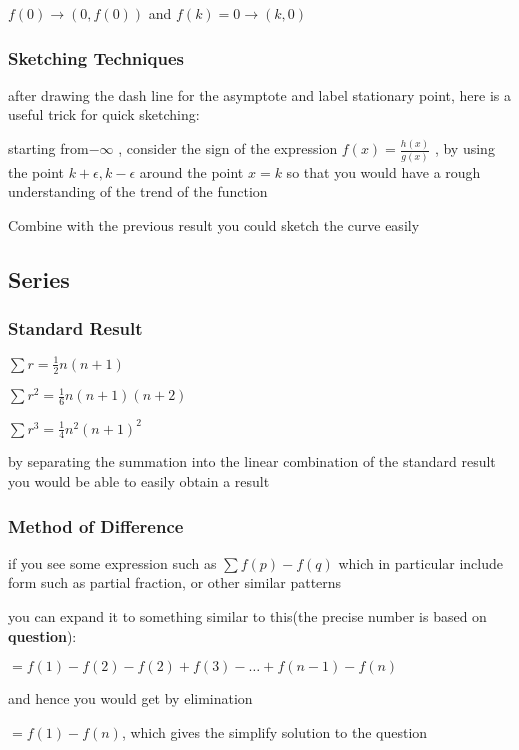 \documentclass[]{article}
\begin{document}
\(f(0) \rightarrow (0,f(0))\) and \(f(k) = 0 \rightarrow (k,0)\)

\subsubsection{Sketching Techniques}\label{header-n184}

after drawing the dash line for the asymptote and label stationary
point, here is a useful trick for quick sketching:

starting from\(-\infty\) , consider the sign of the expression
\(f(x) = \frac{h(x)}{g(x)}\) , by using the point
\(k+\epsilon, k-\epsilon\) around the point \(x = k\) so that you would
have a rough understanding of the trend of the function

Combine with the previous result you could sketch the curve easily

\subsection{Series}\label{header-n188}

\subsubsection{Standard Result}\label{header-n189}

\(\sum{r} =\frac{1}{2}n(n+1)\)

\(\sum r^2 = \frac{1}{6}n(n+1)(n+2)\)

\(\sum r^3 = \frac{1}{4}n^2(n+1)^2\)

by separating the summation into the linear combination of the standard
result you would be able to easily obtain a result

\subsubsection{Method of Difference}\label{header-n194}

if you see some expression such as \(\sum f(p) - f(q)\) which in
particular include form such as partial fraction, or other similar
patterns

you can expand it to something similar to this(the precise number is
based on \textbf{question}):

\(= f(1) - f(2) - f(2) + f(3) -\dots + f(n-1) - f(n)\)

and hence you would get by elimination

\( = f(1) - f(n)\), which gives the simplify solution to the question
\end{document}
